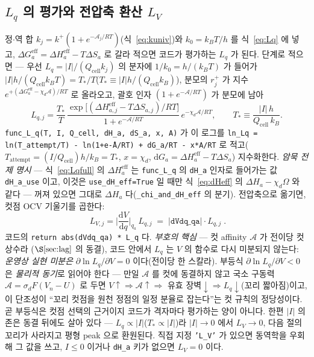 \documentclass[11pt,a4paper]{article}
\newcommand{\dd}{\mathrm{d}}
\newcommand{\eff}{\mathrm{eff}}
\newcommand{\cell}{\mathrm{cell}}
\newcommand{\code}[1]{\texttt{#1}}
\begin{document}
\subsection{$L_q$ 의 평가와 전압축 환산 $L_V$}
정$\cdot$역 합 $k_j=k^+(1+e^{-\mathcal A_j/RT})$(식~\eqref{eq:kuniv})와 $k_0=k_BT/h$ 를 식~\eqref{eq:Lq} 에 넣고,
$\Delta G_a^\eff=\Delta H_a^\eff-T\Delta S_a$ 로 갈라 적으면 코드가 평가하는 $L_q$ 가 된다. 단계로 적으면 --- 우선
$L_q=|I|/(Q_\cell k_j)$ 의 분자에 $1/k_0=h/(k_BT)$ 가 들어가 $|I|h/(Q_\cell k_BT)=T_*/T$($T_*\equiv|I|h/(Q_\cell k_B)$),
분모의 $r_j^+$ 가 지수 $e^{+(\Delta G_a^\eff-\chi_d\mathcal A)/RT}$ 로 올라오고, 괄호 인자 $(1+e^{-\mathcal A/RT})$ 가
분모에 남아
\begin{equation}
L_{q,j}=\frac{T_*}{T}\,\frac{\exp\!\big[(\Delta H_{a,j}^\eff-T\Delta S_{a,j})/RT\big]}{1+e^{-\mathcal A/RT}}
\,e^{-\chi_d\mathcal A/RT},
\qquad T_*\equiv\frac{|I|\,h}{Q_\cell\,k_B}.
\label{eq:Lqfull}
\end{equation}
\code{func\_L\_q(T, I, Q\_cell, dH\_a, dS\_a, x, A)} 가 이 로그를
\code{ln\_Lq = ln(T\_attempt/T) - ln(1+e\^{-A/RT}) + dG\_a/RT - x*A/RT} 로 적고($T_\mathrm{attempt}=(I/Q_\cell)h/k_B=T_*$,
$x=\chi_d$, $\dd G_a=\Delta H_a^\eff-T\Delta S_a$) 지수화한다. \emph{암묵 전제 명시} --- 식~\eqref{eq:Lqfull} 의
$\Delta H_a^\eff$ 는 \code{func\_L\_q} 의 \code{dH\_a} 인자로 들어가는 값 \code{dH\_a\_use} 이고, 이것은
\code{use\_dH\_eff=True} 일 때만 식~\eqref{eq:dHeff} 의 $\Delta H_a-\chi_d\Omega$ 와 같다 --- 꺼져 있으면 그대로
$\Delta H_a$ 다(\code{\_chi\_and\_dH\_eff} 의 분기). 전압축으로 옮기면, 컷점 OCV 기울기를 곱한다:
\begin{equation}
\boxed{\;L_{V,j}=\Big|\frac{\dd V}{\dd q}\Big|_{q_a}\,L_{q,j}\;=\;|\code{dVdq\_qa}|\cdot L_{q,j}\;.}
\label{eq:LV}
\end{equation}
코드의 \code{return abs(dVdq\_qa) * L\_q} 다. \emph{부호의 핵심} --- 컷 affinity $\mathcal A$ 가 전이당 컷 상수라
($\S\ref{sec:lag}$ 의 동결), 코드 안에서 $L_q$ 는 $V$ 의 함수로 다시 미분되지 않는다: \emph{운영상 실현 미분은}
$\partial\ln L_q/\partial V=0$ 이다(전이당 한 스칼라). 부등식 $\partial\ln L_q/\partial V<0$ 은 \emph{물리적 동기}로 읽어야
한다 --- 만일 $\mathcal A$ 를 컷에 동결하지 않고 국소 구동력 $\mathcal A=\sigma_d F(V_n-U)$ 로 두면 $V\!\uparrow\Rightarrow
\mathcal A\!\uparrow\Rightarrow$ 유효 장벽$\downarrow\Rightarrow L_q\downarrow$(꼬리 짧아짐)이고, 이 단조성이 ``꼬리 컷점을
원천 정점의 일정 분율로 잡는다''는 컷 규칙의 정당성이다. 곧 부등식은 컷점 선택의 근거이지 코드가 격자마다 평가하는 양이
아니다. 한편 $|I|$ 의존은 동결 뒤에도 살아 있다 --- $L_q\propto|I|$($T_*\propto|I|$)라 $|I|\to0$
에서 $L_V\to0$, 다음 절의 꼬리가 사라지고 평형 peak 으로 환원된다. 직접 지정 \code{'L\_V'} 가 있으면 동역학을 우회해
그 값을 쓰고, $I\le0$ 이거나 \code{dH\_a} 키가 없으면 $L_V=0$ 이다.
\end{document}
